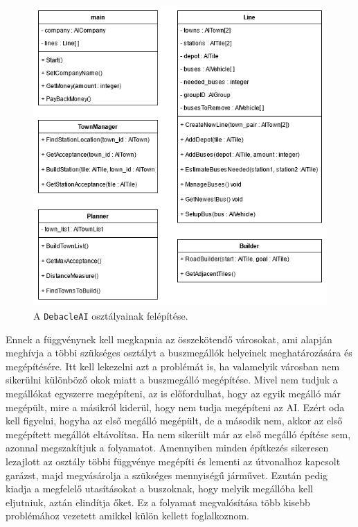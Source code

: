 \begin{figure}
	\centering
	\includegraphics[width=\textwidth]{images/line.png}
	\caption{A \texttt{DebacleAI} osztályainak felépítése.}
	\label{fig:line}
\end{figure}

Ennek a függvénynek kell megkapnia az összekötendő városokat, ami alapján meghívja a többi szükséges osztályt a buszmegállók helyeinek meghatározására és megépítésére. Itt kell lekezelni azt a problémát is, ha valamelyik városban nem sikerülni különböző okok miatt a buszmegálló megépítése. Mivel nem tudjuk a megállókat egyszerre megépíteni, az is előfordulhat, hogy az egyik megálló már megépült, mire a másikról kiderül, hogy nem tudja megépíteni az AI. Ezért oda kell figyelni, hogyha az első megálló megépült, de a második nem, akkor az első megépített megállót eltávolítsa. Ha nem sikerült már az első megálló építése sem, azonnal megszakítjuk a folyamatot. Amennyiben minden építkezés sikeresen lezajlott az osztály többi függvénye megépíti és lementi az útvonalhoz kapcsolt garázst, majd megvásárolja a szükséges mennyiségű járművet. Ezután pedig kiadja a megfelelő utasításokat a buszoknak, hogy melyik megállóba kell eljutniuk, aztán elindítja őket. Ez a folyamat megvalósítása több kisebb problémához vezetett amikkel külön kellett foglalkoznom.

